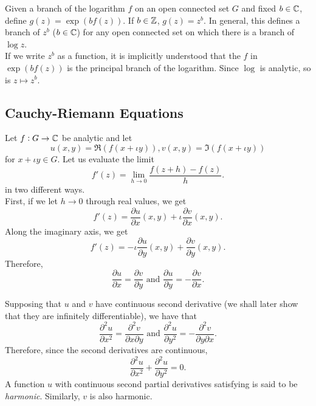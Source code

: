 	Given a branch of the logarithm $f$ on an open connected set $G$ and fixed $b \in \mathbb{C}$, define $g(z) = \exp(bf(z))$. If $b \in \mathbb{Z}$, $g(z) = z^b$. In general, this defines a branch of $z^b$ ($b\in\mathbb{C}$) for any open connected set on which there is a branch of $\log z$.\\
	If we write $z^b$ as a function, it is implicitly understood that the $f$ in $\exp(bf(z))$ is the principal branch of the logarithm. Since $\log$ is analytic, so is $z \mapsto z^b$.




\subsection{Cauchy-Riemann Equations}

	Let $f:G\to\mathbb{C}$ be analytic and let
	\[ u(x,y) = \Re(f(x+\iota y)), v(x,y) = \Im(f(x+\iota y)) \]
	for $x+\iota y \in G$. Let us evaluate the limit
	\[ f'(z) = \lim_{h\to 0} \frac{f(z+h)-f(z)}{h}. \]
	in two different ways.\\
	First, if we let $h\to 0$ through real values, we get
	\[ f'(z) = \frac{\partial u}{\partial x}(x,y) + \iota \frac{\partial v}{\partial x}(x,y). \]
	Along the imaginary axis, we get
	\[ f'(z) = -\iota \frac{\partial u}{\partial y}(x,y) + \frac{\partial v}{\partial y}(x,y). \]
	Therefore,
	\[ \frac{\partial u}{\partial x} = \frac{\partial v}{\partial y} \text{ and } \frac{\partial u}{\partial y} = - \frac{\partial v}{\partial x}. \]

	Supposing that $u$ and $v$ have continuous second derivative (we shall later show that they are infinitely differentiable), we have that
	\[ \frac{\partial^2 u}{\partial x^2} = \frac{\partial^2 v}{\partial x \partial y} \text{ and } \frac{\partial^2 u}{\partial y^2} = - \frac{\partial^2 v}{\partial y \partial x}. \]
	Therefore, since the second derivatives are continuous,
	\begin{equation}
		\label{eqn-harmonic}
		\frac{\partial^2 u}{\partial x^2} + \frac{\partial^2 u}{\partial y^2} = 0.
	\end{equation}
	A function $u$ with continuous second partial derivatives satisfying  is said to be \emph{harmonic}. Similarly, $v$ is also harmonic.

